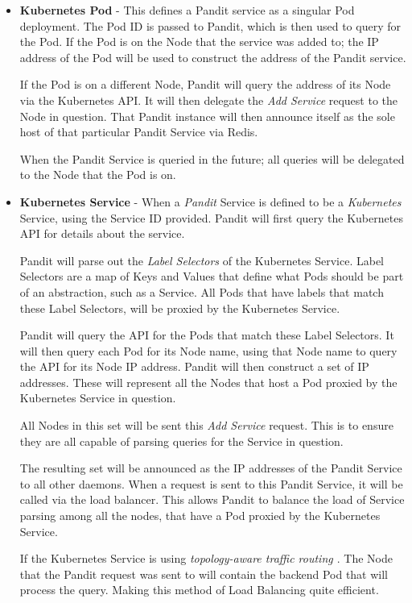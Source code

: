\documentclass[a4paper,12pt]{report}
\begin{document}
\begin{itemize}
    \item \textbf{Kubernetes Pod} - This defines a Pandit service as a singular Pod deployment. The Pod ID is passed to Pandit, which is then used to query for the Pod. If the Pod is on the Node that the service was added to; the IP address of the Pod will be used to construct the address of the Pandit service.
    
    If the Pod is on a different Node, Pandit will query the address of its Node via the Kubernetes API. It will then delegate the \textit{Add Service} request to the Node in question. That Pandit instance will then announce itself as the sole host of that particular Pandit Service via Redis.
    
    When the Pandit Service is queried in the future; all queries will be delegated to the Node that the Pod is on.
    
    \item \textbf{Kubernetes Service} - When a \textit{Pandit} Service is defined to be a \textit{Kubernetes} Service, using the Service ID provided. Pandit will first query the Kubernetes API for details about the service.
    
    Pandit will parse out the \textit{Label Selectors} of the Kubernetes Service. Label Selectors are a map of Keys and Values that define what Pods should be part of an abstraction, such as a Service. 
    All Pods that have labels that match these Label Selectors, will be proxied by the Kubernetes Service. 
    
    Pandit will query the API for the Pods that match these Label Selectors. It will then query each Pod for its Node name, using that Node name to query
    the API for its Node IP address. Pandit will then construct a set of IP addresses. These will represent all the Nodes that host a Pod proxied by the Kubernetes Service in question.
    
    All Nodes in this set will be sent this \textit{Add Service} request. This is to ensure they are all capable of parsing queries for the Service in question.
    
    The resulting set will be announced as the IP addresses of the Pandit Service to all other daemons. When a request is sent to this Pandit Service,
    it will be called via the load balancer. This allows Pandit to balance the load of Service parsing among all the nodes, that have a Pod proxied by the Kubernetes Service. 
    
    If the Kubernetes Service is using \textit{topology-aware traffic routing \cite{k8s_topology}}. The Node that the Pandit request was sent to will contain the backend Pod that will process the query. Making this method of Load Balancing quite efficient. 
    

\end{itemize}
\end{document}
